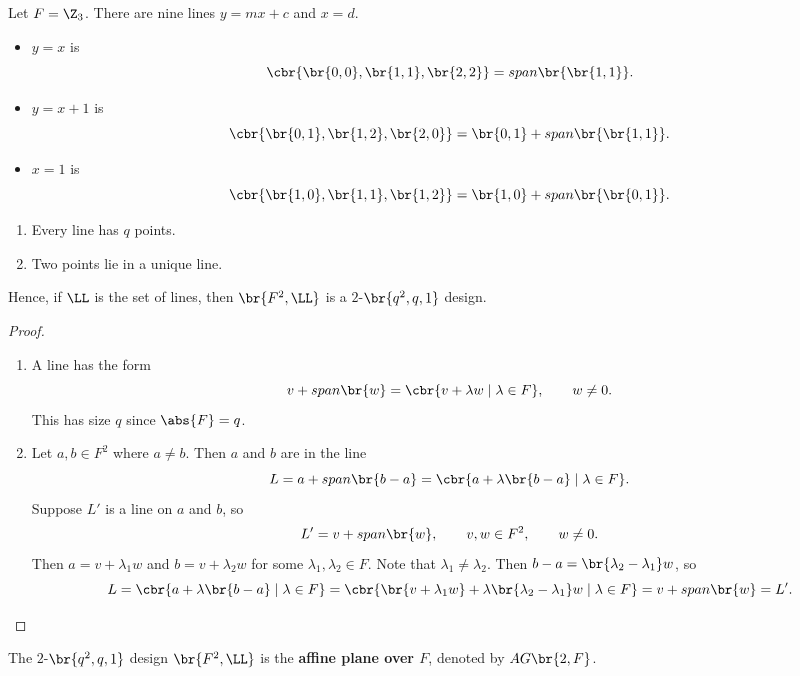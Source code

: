 
\begin{example*}
Let $ F = \Z_3 $. There are nine lines $ y = mx + c $ and $ x = d $.
\begin{itemize}
\item $ y = x $ is
$$ \cbr{\br{0, 0}, \br{1, 1}, \br{2, 2}} = span\br{\br{1, 1}}. $$
\item $ y = x + 1 $ is
$$ \cbr{\br{0, 1}, \br{1, 2}, \br{2, 0}} = \br{0, 1} + span\br{\br{1, 1}}. $$
\item $ x = 1 $ is
$$ \cbr{\br{1, 0}, \br{1, 1}, \br{1, 2}} = \br{1, 0} + span\br{\br{0, 1}}. $$
\end{itemize}
\end{example*}

\pagebreak

\begin{proposition}
\hfill
\begin{enumerate}
\item Every line has $ q $ points.
\item Two points lie in a unique line.
\end{enumerate}
Hence, if $ \LL $ is the set of lines, then $ \br{F^2, \LL} $ is a $ 2 $-$ \br{q^2, q, 1} $ design.
\end{proposition}

\begin{proof}
\hfill
\begin{enumerate}
\item A line has the form
$$ v + span\br{w} = \cbr{v + \lambda w \mid \lambda \in F}, \qquad w \ne 0. $$
This has size $ q $ since $ \abs{F} = q $.
\item Let $ a, b \in F^2 $ where $ a \ne b $. Then $ a $ and $ b $ are in the line
$$ L = a + span\br{b - a} = \cbr{a + \lambda\br{b - a} \mid \lambda \in F}. $$
Suppose $ L' $ is a line on $ a $ and $ b $, so
$$ L' = v + span\br{w}, \qquad v, w \in F^2, \qquad w \ne 0. $$
Then $ a = v + \lambda_1w $ and $ b = v + \lambda_2w $ for some $ \lambda_1, \lambda_2 \in F $. Note that $ \lambda_1 \ne \lambda_2 $. Then $ b - a = \br{\lambda_2 - \lambda_1}w $, so
$$ L = \cbr{a + \lambda\br{b - a} \mid \lambda \in F} = \cbr{\br{v + \lambda_1w} + \lambda\br{\lambda_2 - \lambda_1}w \mid \lambda \in F} = v + span\br{w} = L'. $$
\end{enumerate}
\end{proof}

\begin{definition*}
The $ 2 $-$ \br{q^2, q, 1} $ design $ \br{F^2, \LL} $ is the \textbf{affine plane over $ F $}, denoted by $ AG\br{2, F} $.
\end{definition*}

